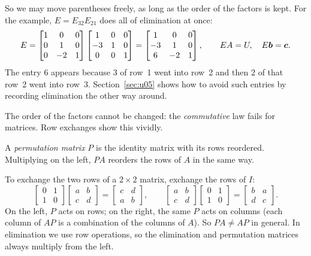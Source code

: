 So we may move parentheses freely, as long as the order of the factors is kept. For the
example, $E=E_{32}E_{21}$ does all of elimination at once:
\[
  E=\begin{bmatrix} 1 & 0 & 0\\ 0 & 1 & 0\\ 0 & -2 & 1\end{bmatrix}
  \begin{bmatrix} 1 & 0 & 0\\ -3 & 1 & 0\\ 0 & 0 & 1\end{bmatrix}
  =\begin{bmatrix} 1 & 0 & 0\\ -3 & 1 & 0\\ 6 & -2 & 1\end{bmatrix},\qquad EA=U,\quad E\boldsymbol{b}=\boldsymbol{c}.
\]
The entry $6$ appears because $3$ of row~1 went into row~2 and then $2$ of that row~2 went into
row~3. Section~\ref{sec:u05} shows how to avoid such entries by recording elimination the
other way around.

The order of the factors cannot be changed: the \emph{commutative} law fails for matrices.
Row exchanges show this vividly.

\begin{definition}\label{def:u03-perm}
A \emph{permutation matrix} $P$ is the identity matrix with its rows reordered. Multiplying
on the left, $PA$ reorders the rows of $A$ in the same way.
\end{definition}

To exchange the two rows of a $2\times2$ matrix, exchange the rows of $I$:
\[
  \begin{bmatrix} 0 & 1\\ 1 & 0\end{bmatrix}\begin{bmatrix} a & b\\ c & d\end{bmatrix}
  =\begin{bmatrix} c & d\\ a & b\end{bmatrix},
  \qquad
  \begin{bmatrix} a & b\\ c & d\end{bmatrix}\begin{bmatrix} 0 & 1\\ 1 & 0\end{bmatrix}
  =\begin{bmatrix} b & a\\ d & c\end{bmatrix}.
\]
On the left, $P$ acts on rows; on the right, the same $P$ acts on columns (each column of $AP$
is a combination of the columns of $A$). So $PA\neq AP$ in general. In elimination we use
row operations, so the elimination and permutation matrices always multiply from the left.

